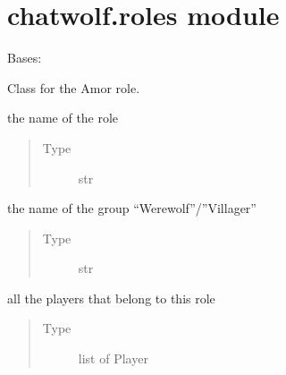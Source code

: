 \documentclass[letterpaper,10pt,english]{sphinxmanual}
\begin{document}
\section{chatwolf.roles module}
\label{\detokenize{chatwolf:chatwolf-roles-module}}

\begin{fulllineitems}
Bases: 

Class for the Amor role.


\begin{fulllineitems}
the name of the role
\begin{quote}\begin{description}
\item[{Type}] \leavevmode
str

\end{description}\end{quote}

\end{fulllineitems}



\begin{fulllineitems}
the name of the group “Werewolf”/”Villager”
\begin{quote}\begin{description}
\item[{Type}] \leavevmode
str

\end{description}\end{quote}

\end{fulllineitems}



\begin{fulllineitems}
all the players that belong to this role
\begin{quote}\begin{description}
\item[{Type}] \leavevmode
list of Player

\end{description}\end{quote}


\end{fulllineitems}
\end{fulllineitems}
\end{document}
